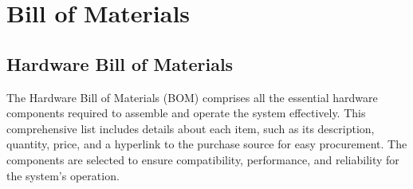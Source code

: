 %
%

\chapter{Bill of Materials}

\section{Hardware Bill of Materials}

The Hardware Bill of Materials (BOM) comprises all the essential hardware components required to assemble and operate the system effectively. This comprehensive list includes details about each item, such as its description, quantity, price, and a hyperlink to the purchase source for easy procurement. The components are selected to ensure compatibility, performance, and reliability for the system's operation.

